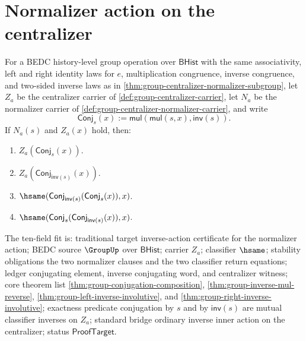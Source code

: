 \section{Normalizer action on the centralizer}
\label{sec:group-normalizer-action-on-centralizer}

\begin{theorem}
\label{thm:group-normalizer-conjugation-inverse-roundtrip}
For a BEDC history-level group operation over $\mathsf{BHist}$ with the same
associativity, left and right identity laws for $e$, multiplication
congruence, inverse congruence, and two-sided inverse laws as in
\autoref{thm:group-centralizer-normalizer-subgroup}, let $Z_a$ be the
centralizer carrier of \autoref{def:group-centralizer-carrier}, let $N_a$ be
the normalizer carrier of \autoref{def:group-centralizer-normalizer-carrier},
and write
$$
\mathsf{Conj}_s(x):=
\mathsf{mul}(\mathsf{mul}(s,x),\mathsf{inv}(s)).
$$
If $N_a(s)$ and $Z_a(x)$ hold, then:
\begin{enumerate}
\item $Z_a(\mathsf{Conj}_s(x))$.
\item $Z_a(\mathsf{Conj}_{\mathsf{inv}(s)}(x))$.
\item
$\hsame(\mathsf{Conj}_{\mathsf{inv}(s)}(\mathsf{Conj}_s(x)),x)$.
\item
$\hsame(\mathsf{Conj}_s(\mathsf{Conj}_{\mathsf{inv}(s)}(x)),x)$.
\end{enumerate}
The ten-field fit is: traditional target inverse-action certificate for the
normalizer action; BEDC source $\GroupUp$ over $\mathsf{BHist}$; carrier $Z_a$;
classifier $\hsame$; stability obligations the two normalizer clauses and the
two classifier return equations; ledger conjugating element, inverse
conjugating word, and centralizer witness; core theorem list
\autoref{thm:group-conjugation-composition},
\autoref{thm:group-inverse-mul-reverse},
\autoref{thm:group-left-inverse-involutive}, and
\autoref{thm:group-right-inverse-involutive}; exactness predicate conjugation
by $s$ and by $\mathsf{inv}(s)$ are mutual classifier inverses on $Z_a$;
standard bridge ordinary inverse inner action on the centralizer; status
$\mathsf{ProofTarget}$.
\end{theorem}

